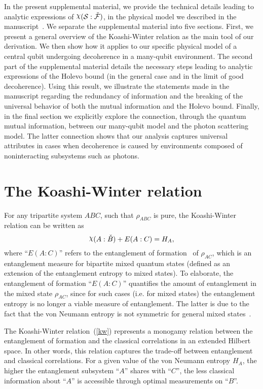 \documentclass[aps,prl,showpacs,amsmath,amssymb,amsfonts,lengthcheck,onecolumn,longbibliography,superscriptaddress]{revtex4-2}
\newcommand{\+}         {\dagger}
\DeclareRobustCommand{\rchi}{{\mathpalette\irchi\relax}}
\newcommand{\irchi}[2]{\raisebox{\depth}{$#1\chi$}}
\newcommand{\mc}[1]{\mathcal{#1}}
\begin{document}
In the present supplemental material, we provide the technical details leading to analytic expressions of $\rchi(\mc{S}:\check{\mc{F}})$, in the physical model we described in the manuscript~\cite{darwint1}. We separate the supplemental material into five sections. First, we present a general overview of the Koashi-Winter relation as the main tool of our derivation. We then show how it applies to our specific physical model of a central qubit undergoing decoherence in a many-qubit environment. The second part of the supplemental material details the necessary steps leading to analytic expressions of the Holevo bound (in the general case and in the limit of good decoherence). Using this result, we illustrate the statements made in the manuscript regarding the redundancy of information and the breaking of the universal behavior of both the mutual information and the Holevo bound. Finally, in the final section we explicitly explore the connection, through the quantum mutual information, between our many-qubit model and the photon scattering model. The latter connection shows that our analysis captures universal attributes in cases when decoherence is caused by environments composed of noninteracting subsystems such as photons.

\section{The Koashi-Winter relation}
For any tripartite system $ABC$, such that $\rho_{ABC}$ is pure, the Koashi-Winter relation can be written as~\cite{KW}
\begin{equation}
	\rchi(A:\check{B})+E(A:C)=H_A,
	\label{kw}
\end{equation}
where ``$E(A:C)$'' refers to the entanglement of formation~\cite{concurrence1,concurrence2,wootters2001entanglement} of $\rho_{AC}$, which is an entanglement measure for bipartite mixed quantum states (defined as an extension of the entanglement entropy to mixed states). To elaborate, the entanglement of formation ``$E(A:C)$'' quantifies the amount of entanglement in the mixed state $\rho_{AC}$, since for such cases (i.e. for mixed states) the entanglement entropy is no longer a viable measure of entanglement. The latter is due to the fact that the von Neumann entropy is not symmetric for general mixed states~\cite{nielsen2002quantum}.

The Koashi-Winter relation~(\ref{kw}) represents a monogamy relation between the entanglement of formation and the classical correlations in an extended Hilbert space. In other words, this relation captures the trade-off between entanglement and classical correlations. For a given value of the von Neumann entropy $H_{A}$, the higher the entanglement subsystem ``$A$'' shares with ``$C$'', the less classical information about ``$A$'' is accessible through optimal measurements on ``$B$''.
\end{document}
